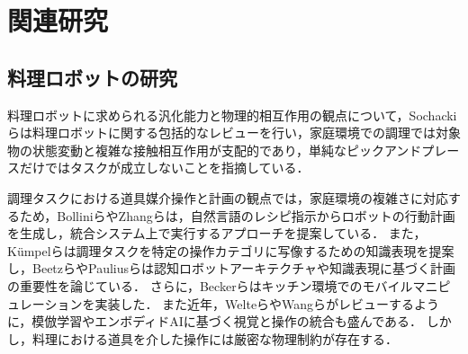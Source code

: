 \chapter{関連研究}

\section{料理ロボットの研究}
料理ロボットに求められる汎化能力と物理的相互作用の観点について，Sochackiら\cite{Sochacki2024PracticalChefReview}は料理ロボットに関する包括的なレビューを行い，家庭環境での調理では対象物の状態変動と複雑な接触相互作用が支配的であり，単純なピックアンドプレースだけではタスクが成立しないことを指摘している．

調理タスクにおける道具媒介操作と計画の観点では，家庭環境の複雑さに対応するため，Bolliniら\cite{Bollini2013RecipesCookingRobot}やZhangら\cite{Zhang2024RealWorldCookingFromRecipes}は，自然言語のレシピ指示からロボットの行動計画を生成し，統合システム上で実行するアプローチを提案している．
また，Kümpelら\cite{Kumpel2025CookingActions}は調理タスクを特定の操作カテゴリに写像するための知識表現を提案し，Beetzら\cite{Beetz2011CRAM}やPauliusら\cite{PauliusSun2019CookingSurvey}は認知ロボットアーキテクチャや知識表現に基づく計画の重要性を論じている．
さらに，Beckerら\cite{Becker2011KitchenContainers}はキッチン環境でのモバイルマニピュレーションを実装した．
また近年，Welteら\cite{Welte2025DexterousILSurvey}やWangら\cite{Wang2025EmbodiedVisualPerceptionSurvey}がレビューするように，模倣学習やエンボディドAIに基づく視覚と操作の統合も盛んである．
しかし，料理における道具を介した操作には厳密な物理制約が存在する．

